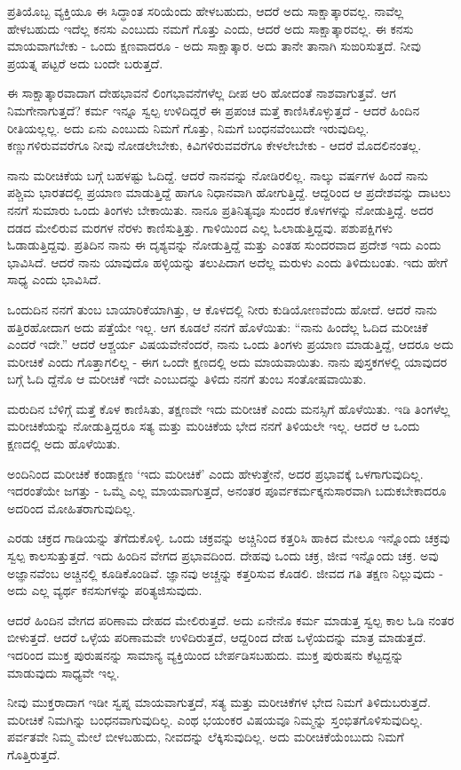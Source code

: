 ಪ್ರತಿಯೊಬ್ಬ ವ್ಯಕ್ತಿಯೂ ಈ ಸಿದ್ಧಾಂತ ಸರಿಯೆಂದು ಹೇಳಬಹುದು, ಆದರೆ ಅದು ಸಾಕ್ಷಾತ್ಕಾರವಲ್ಲ. ನಾವೆಲ್ಲ ಹೇಳಬಹುದು ಇದೆಲ್ಲ ಕನಸು ಎಂಬುದು ನಮಗೆ ಗೊತ್ತು ಎಂದು, ಆದರೆ ಅದು ಸಾಕ್ಷಾತ್ಕಾರವಲ್ಲ. ಈ ಕನಸು ಮಾಯವಾಗಬೇಕು - ಒಂದು ಕ್ಷಣವಾದರೂ - ಅದು ಸಾಕ್ಷಾತ್ಕಾರ. ಅದು ತಾನೇ ತಾನಾಗಿ ಸುಙರಿಸುತ್ತದೆ. ನೀವು ಪ್ರಯತ್ನ ಪಟ್ಟರೆ ಅದು ಬಂದೇ ಬರುತ್ತದೆ.

ಈ ಸಾಕ್ಷಾತ್ಕಾರವಾದಾಗ ದೇಹಭಾವನೆ ಲಿಂಗಭಾವನೆಗಳೆಲ್ಲ ದೀಪ ಆರಿ ಹೋದಂತೆ ನಾಶವಾಗುತ್ತವೆ. ಆಗ ನಿಮಗೇನಾಗುತ್ತದೆ? ಕರ್ಮ ಇನ್ನೂ ಸ್ವಲ್ಪ ಉಳಿದಿದ್ದರೆ ಈ ಪ್ರಪಂಚ ಮತ್ತೆ ಕಾಣಿಸಿಕೊಳ್ಳುತ್ತದೆ - ಆದರೆ ಹಿಂದಿನ ರೀತಿಯಲ್ಲಲ್ಲ. ಅದು ಏನು ಎಂಬುದು ನಿಮಗೆ ಗೊತ್ತು, ನಿಮಗೆ ಬಂಧನವೆಂಬುದೇ ಇರುವುದಿಲ್ಲ. ಕಣ್ಣುಗಳಿರುವವರೆಗೂ ನೀವು ನೋಡಲೇಬೇಕು, ಕಿವಿಗಳಿರುವವರೆಗೂ ಕೇಳಲೇಬೇಕು - ಆದರೆ ಮೊದಲಿನಂತಲ್ಲ.

ನಾನು ಮರೀಚಿಕೆಯ ಬಗ್ಗೆ ಬಹಳಷ್ಟು ಓದಿದ್ದೆ. ಆದರೆ ನಾನವನ್ನು ನೋಡಿರಲಿಲ್ಲ. ನಾಲ್ಕು ವರ್ಷಗಳ ಹಿಂದೆ ನಾನು ಪಶ್ಚಿಮ ಭಾರತದಲ್ಲಿ ಪ್ರಯಾಣ ಮಾಡುತ್ತಿದ್ದೆ ಹಾಗೂ ನಿಧಾನವಾಗಿ ಹೋಗುತ್ತಿದ್ದೆ. ಆದ್ದರಿಂದ ಆ ಪ್ರದೇಶವನ್ನು ದಾಟಲು ನನಗೆ ಸುಮಾರು ಒಂದು ತಿಂಗಳು ಬೇಕಾಯಿತು. ನಾನೂ ಪ್ರತಿನಿತ್ಯವೂ ಸುಂದರ ಕೊಳಗಳನ್ನು ನೋಡುತ್ತಿದ್ದೆ. ಅದರ ದಡದ ಮೇಲಿರುವ ಮರಗಳ ನೆರಳು ಕಾಣಿಸುತ್ತಿತ್ತು. ಗಾಳಿಯಿಂದ ಎಲ್ಲ ಓಲಾಡುತ್ತಿದ್ದವು. ಪಶುಪಕ್ಷಿಗಳು ಓಡಾಡುತ್ತಿದ್ದವು. ಪ್ರತಿದಿನ ನಾನು ಈ ದೃಶ್ಯವನ್ನು ನೋಡುತ್ತಿದ್ದೆ ಮತ್ತು ಎಂತಹ ಸುಂದರವಾದ ಪ್ರದೇಶ ಇದು ಎಂದು ಭಾವಿಸಿದೆ. ಆದರೆ ನಾನು ಯಾವುದೊ ಹಳ್ಳಿಯನ್ನು ತಲುಪಿದಾಗ ಅದೆಲ್ಲ ಮರುಳು ಎಂದು ತಿಳಿದುಬಂತು. ಇದು ಹೇಗೆ ಸಾಧ್ಯ ಎಂದು ಭಾವಿಸಿದೆ.

ಒಂದುದಿನ ನನಗೆ ತುಂಬ ಬಾಯಾರಿಕೆಯಾಗಿತ್ತು, ಆ ಕೊಳದಲ್ಲಿ ನೀರು ಕುಡಿಯೋಣವೆಂದು ಹೋದೆ. ಆದರೆ ನಾನು ಹತ್ತಿರಹೋದಾಗ ಅದು ಪತ್ತೆಯೇ ಇಲ್ಲ. ಆಗ ಕೂಡಲೆ ನನಗೆ ಹೊಳೆಯಿತು: “ನಾನು ಹಿಂದೆಲ್ಲ ಓದಿದ ಮರೀಚಿಕೆ ಎಂದರೆ ಇದೇ.” ಆದರೆ ಆಶ್ಚರ್ಯ ವಿಷಯವೇನೆಂದರೆ, ನಾನು ಒಂದು ತಿಂಗಳು ಪ್ರಯಾಣ ಮಾಡುತ್ತಿದ್ದೆ, ಆದರೂ ಅದು ಮರೀಚಿಕೆ ಎಂದು ಗೊತ್ತಾಗಲಿಲ್ಲ - ಈಗ ಒಂದೇ ಕ್ಷಣದಲ್ಲಿ ಅದು ಮಾಯವಾಯಿತು. ನಾನು ಪುಸ್ತಕಗಳಲ್ಲಿ ಯಾವುದರ ಬಗ್ಗೆ ಓದಿ ದ್ದೆನೊ ಆ ಮರೀಚಿಕೆ ಇದೇ ಎಂಬುದನ್ನು ತಿಳಿದು ನನಗೆ ತುಂಬ ಸಂತೋಷವಾಯಿತು.

ಮರುದಿನ ಬೆಳಿಗ್ಗೆ ಮತ್ತೆ ಕೊಳ ಕಾಣಿಸಿತು, ತಕ್ಷಣವೇ ಇದು ಮರೀಚಿಕೆ ಎಂದು ಮನಸ್ಸಿಗೆ ಹೊಳೆಯಿತು. ಇಡಿ ತಿಂಗಳೆಲ್ಲ ಮರೀಚಿಕೆಯನ್ನು ನೋಡುತ್ತಿದ್ದರೂ ಸತ್ಯ ಮತ್ತು ಮರಿಚಿಕೆಯ ಭೇದ ನನಗೆ ತಿಳಿಯಲೇ ಇಲ್ಲ. ಆದರೆ ಆ ಒಂದು ಕ್ಷಣದಲ್ಲಿ ಅದು ಹೊಳೆಯಿತು.

ಅಂದಿನಿಂದ ಮರೀಚಿಕೆ ಕಂಡಾಕ್ಷಣ ‘ಇದು ಮರೀಚಿಕೆ’ ಎಂದು ಹೇಳುತ್ತೇನೆ, ಅದರ ಪ್ರಭಾವಕ್ಕೆ ಒಳಗಾಗುವುದಿಲ್ಲ. ಇದರಂತೆಯೇ ಜಗತ್ತು - ಒಮ್ಮೆ ಎಲ್ಲ ಮಾಯವಾಗುತ್ತದೆ, ಅನಂತರ ಪೂರ್ವಕರ್ಮಕ್ಕನುಸಾರವಾಗಿ ಬದುಕಬೇಕಾದರೂ ಅದರಿಂದ ಮೋಹಿತರಾಗುವುದಿಲ್ಲ.

ಎರಡು ಚಕ್ರದ ಗಾಡಿಯನ್ನು ತೆಗೆದುಕೊಳ್ಳಿ. ಒಂದು ಚಕ್ರವನ್ನು ಅಚ್ಚಿನಿಂದ ಕತ್ತರಿಸಿ ಹಾಕಿದ ಮೇಲೂ ಇನ್ನೊಂದು ಚಕ್ರವು ಸ್ವಲ್ಪ ಕಾಲಸುತ್ತುತ್ತದೆ. ಇದು ಹಿಂದಿನ ವೇಗದ ಪ್ರಭಾವದಿಂದ. ದೇಹವು ಒಂದು ಚಕ್ರ, ಜೀವ ಇನ್ನೊಂದು ಚಕ್ರ. ಅವು ಅಜ್ಞಾನವೆಂಬ ಅಚ್ಚಿನಲ್ಲಿ ಕೂಡಿಕೊಂಡಿವೆ. ಜ್ಞಾನವು ಅಚ್ಚನ್ನು ಕತ್ತರಿಸುವ ಕೊಡಲಿ. ಜೀವದ ಗತಿ ತಕ್ಷಣ ನಿಲ್ಲುವುದು - ಅದು ಎಲ್ಲ ವ್ಯರ್ಥ ಕನಸುಗಳನ್ನು ಪರಿತ್ಯಜಿಸುವುದು.

ಆದರೆ ಹಿಂದಿನ ವೇಗದ ಪರಿಣಾಮ ದೇಹದ ಮೇಲಿರುತ್ತದೆ. ಅದು ಏನೇನೊ ಕರ್ಮ ಮಾಡುತ್ತ ಸ್ವಲ್ಪ ಕಾಲ ಓಡಿ ನಂತರ ಬೀಳುತ್ತದೆ. ಆದರೆ ಒಳ್ಳೆಯ ಪರಿಣಾಮವೇ ಉಳಿದಿರುತ್ತದೆ, ಆದ್ದರಿಂದ ದೇಹ ಒಳ್ಳೆಯದನ್ನು ಮಾತ್ರ ಮಾಡುತ್ತದೆ. ಇದರಿಂದ ಮುಕ್ತ ಪುರುಷನನ್ನು ಸಾಮಾನ್ಯ ವ್ಯಕ್ತಿಯಿಂದ ಬೇರ್ಪಡಿಸಬಹುದು. ಮುಕ್ತ ಪುರುಷನು ಕೆಟ್ಟದ್ದನ್ನು ಮಾಡುವುದು ಸಾಧ್ಯವೇ ಇಲ್ಲ.

ನೀವು ಮುಕ್ತರಾದಾಗ ಇಡೀ ಸ್ವಪ್ನ ಮಾಯವಾಗುತ್ತದೆ, ಸತ್ಯ ಮತ್ತು ಮರೀಚಿಕೆಗಳ ಭೇದ ನಿಮಗೆ ತಿಳಿದುಬರುತ್ತದೆ. ಮರೀಚಿಕೆ ನಿಮಗಿನ್ನು ಬಂಧನವಾಗುವುದಿಲ್ಲ. ಎಂಥ ಭಯಂಕರ ವಿಷಯವೂ ನಿಮ್ಮನ್ನು ಸ್ತಂಭಿತಗೊಳಿಸುವುದಿಲ್ಲ. ಪರ್ವತವೇ ನಿಮ್ಮ ಮೇಲೆ ಬೀಳಬಹುದು, ನೀವದನ್ನು ಲೆಕ್ಕಿಸುವುದಿಲ್ಲ. ಅದು ಮರೀಚಿಕೆಯೆಂಬುದು ನಿಮಗೆ ಗೊತ್ತಿರುತ್ತದೆ.

